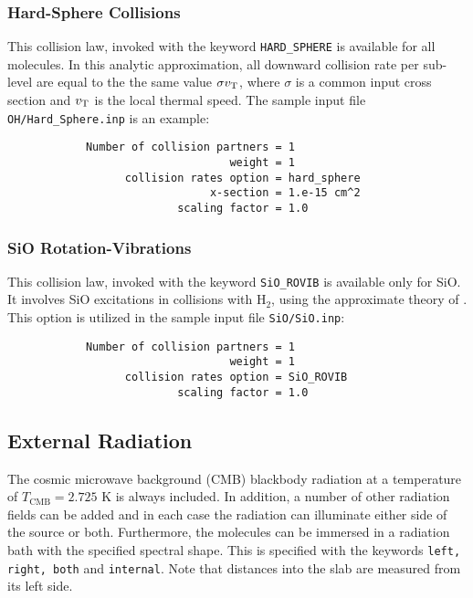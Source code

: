 \documentclass[12pt]{article}
\def\separation {0.5cm}
\begin{document}
\subsubsection{Hard-Sphere Collisions}

This collision law, invoked with the keyword \texttt{HARD\_SPHERE} is available
for all molecules. In this analytic approximation, all downward collision rate
per sub-level are equal to the the same value $\sigma v_{\rm T}$, where
$\sigma$ is a common input cross section and $v_{\rm T}$ is the local thermal
speed. The sample input file \texttt{OH/Hard\_Sphere.inp} is an example:

\vspace{\separation}
\begin{verbatim}
            Number of collision partners = 1
                                  weight = 1
                  collision rates option = hard_sphere
                               x-section = 1.e-15 cm^2
                          scaling factor = 1.0
\end{verbatim}

\subsubsection{SiO Rotation-Vibrations}

This collision law, invoked with the keyword \texttt{SiO\_ROVIB} is available
only for SiO. It involves SiO excitations in collisions with H$_2$, using the
approximate theory of \cite{bieniek_green83}. This option is utilized in the sample
input file \texttt{SiO/SiO.inp}:

\vspace{\separation}
\begin{verbatim}
            Number of collision partners = 1
                                  weight = 1
                  collision rates option = SiO_ROVIB
                          scaling factor = 1.0
\end{verbatim}



\subsection{External Radiation}

The cosmic microwave background (CMB) blackbody radiation at a temperature of
$T_\mathrm{CMB}=2.725$ K is always included. In addition, a number of other
radiation fields can be added and in each case the radiation can illuminate
either side of the source or both. Furthermore, the molecules can be immersed
in a radiation bath with the specified spectral shape. This is specified with
the keywords \texttt{left, right, both} and \texttt{internal}. Note that
distances into the slab are measured from its left side.
\end{document}
